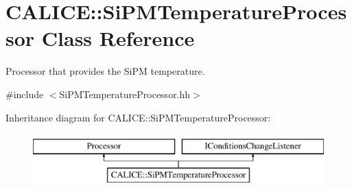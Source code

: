 \section{C\-A\-L\-I\-C\-E\-:\-:Si\-P\-M\-Temperature\-Processor Class Reference}
\label{classCALICE_1_1SiPMTemperatureProcessor}


Processor that provides the Si\-P\-M temperature.  




{\ttfamily \#include $<$Si\-P\-M\-Temperature\-Processor.\-hh$>$}

Inheritance diagram for C\-A\-L\-I\-C\-E\-:\-:Si\-P\-M\-Temperature\-Processor\-:\begin{figure}[H]
\begin{center}
\leavevmode
\includegraphics[height=2.000000cm]{classCALICE_1_1SiPMTemperatureProcessor}
\end{center}
\end{figure}
